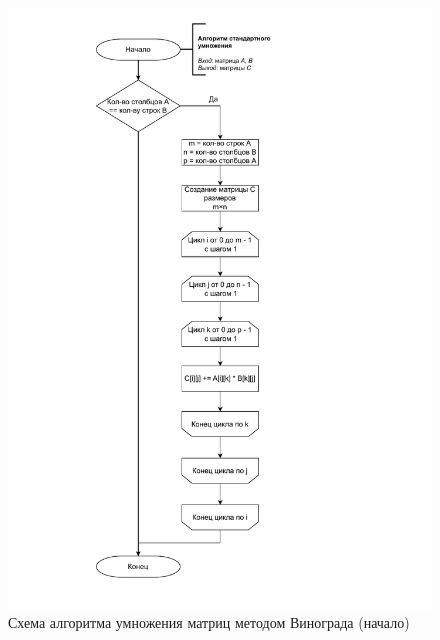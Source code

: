 \clearpage

\begin{figure}[h]
	\centering
	\includegraphics[height=0.9\textheight, page=2]{img/algorithms.pdf}
	\caption{Схема алгоритма умножения матриц методом Винограда (начало)}
	\label{fig:Vinograd1}
\end{figure}

\clearpage

